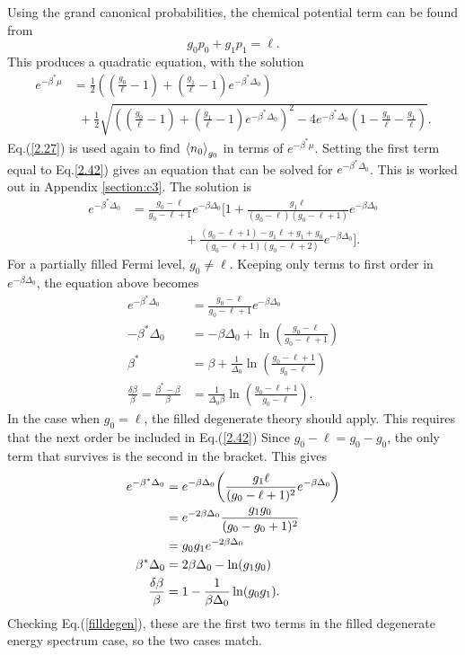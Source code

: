 Using the grand canonical probabilities, the chemical potential term can be found from
\begin{equation}
    g_0 p_0+g_1 p_1=\ell. \label{2.40}
\end{equation}
This produces a quadratic equation, with the solution
\begin{align}
    e^{-\beta^*\mu }&=\frac{1}{2}((\frac{g_0}{\ell}-1)+(\frac{g_1}{\ell}-1)e^{-\beta^*\Delta_0})\nonumber\\
    &\ \ +\frac{1}{2}\sqrt{((\frac{g_0}{\ell}-1)+(\frac{g_1}{\ell}-1)e^{-\beta^*\Delta_0})^2-4e^{-\beta^*\Delta_0}(1-\frac{g_0}{\ell}-\frac{g_1}{\ell})} . \label{2.42}
\end{align}
Eq.\@(\ref{2.27}) is used again to find $\left<{n_0}\right>_{g_0}$ in terms of $e^{-\beta^*\mu}$.
Setting the first term equal to Eq.\@ \ref{2.42}) gives an equation that can be solved for $e^{-\beta^*\Delta_0}$. This is worked out in Appendix \ref{section:c3}. The solution is
\begin{align}
    e^{-\beta^*\Delta_0}&=\frac{g_0-\ell}{g_0-\ell+1}e^{-\beta\Delta_0} \Biggr[1+\frac{g_1 \ell}{(g_0-\ell)(g_0-\ell+1)}e^{-\beta\Delta_0}\nonumber\\
    &\ \ \ \ \ \ \ \ \ \ \ \ \ \ \ \ \ \ \ +\frac{(g_0-\ell+1)-g_1\ell+g_1+g_0}{(g_0-\ell+1)(g_0-\ell+2)}e^{-\beta\Delta_0}\Biggr]. \label{2.42}
\end{align}
For a partially filled Fermi level, $g_0\neq \ell$. Keeping only terms to first order in $e^{-\beta\Delta_0}$, the equation above becomes
\begin{align}
    e^{-\beta^*\Delta_0}&=\frac{g_0-\ell}{g_0-\ell+1} e^{-\beta\Delta_0}\nonumber\\
    -\beta^*\Delta_0&=-\beta\Delta_0+\ln(\frac{g_0-\ell}{g_0-\ell+1})\nonumber\\
    \beta^*&=\beta+\frac{1}{\Delta_0}\ln(\frac{g_0-\ell+1}{g_0-\ell})\nonumber\\
    \frac{\delta\beta}{\beta}=\frac{\beta^*-\beta}{\beta}&=\frac{1}{\Delta_0 \beta}\ln(\frac{g_0-\ell+1}{g_0-\ell}). \label{partfilldegen1}
\end{align}
In the case when $g_0=\ell$, the filled degenerate theory should apply. This requires that the next order be included in Eq.\@ (\ref{2.42}) Since $g_0-\ell=g_0-g_0$, the only term that survives is the second in the bracket. This gives
\begin{align}
    e^{-\beta^*\Delta_0}&= e^{-\beta\Delta_0} \qty(\frac{g_1 \ell}{(g_0-\ell+1)^2} e^{-\beta\Delta_0})\nonumber\\
    &=e^{-2\beta\Delta_0} \frac{g_1 g_0}{(g_0-g_0+1)^2}\nonumber\\
    &=g_0g_1e^{-2\beta\Delta_0}\nonumber\\
    \beta^*\Delta_0&=2\beta\Delta_0 - \ln(g_1g_0)\nonumber\\
    \frac{\delta\beta}{\beta}&=1-\frac{1}{\beta\Delta_0} \ln(g_0g_1). \label{partfilldegen}
\end{align}
Checking Eq.\@ (\ref{filldegen}), these are the first two terms in the filled degenerate energy spectrum case, so the two cases match. 
